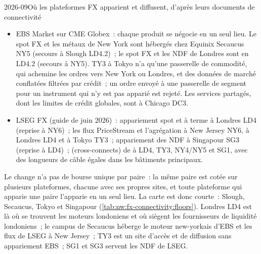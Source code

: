 \begin{dated}{2026-09}{Où les plateformes FX apparient et diffusent, d'après leurs documents de connectivité}\label{dat:nw:fx-connectivity:sites}
\begin{itemize}
\item EBS Market sur CME Globex~: chaque produit se négocie en un seul lieu. Le spot FX et les métaux de New York sont hébergés chez Equinix Secaucus NY5
  (secours à Slough LD4.2)~; le spot FX et les NDF de Londres sont en LD4.2 (secours à NY5). TY3 à Tokyo n'a qu'une passerelle de commodité, qui achemine les ordres
  vers New York ou Londres, et des données de marché conflatées filtrées par crédit~; un ordre envoyé à une passerelle de segment pour un instrument
  qui n'y est pas apparié est rejeté. Les services partagés, dont les limites de crédit globales, sont à Chicago DC3.
\item LSEG FX (guide de juin 2026)~: appariement spot et à terme à Londres LD4 (reprise à NY6)~; les flux PriceStream et
  l'agrégation à New Jersey NY6, à Londres LD4 et à Tokyo TY3~; appariement des NDF à Singapour SG3 (reprise à LD4)~; 
   (cross-connects) de  à LD4, TY3, NY4/NY5 et SG1, avec des longueurs de câble égales dans les bâtiments principaux.
\end{itemize}
\end{dated}

Le change n'a pas de bourse unique par paire~: la même paire est cotée sur plusieurs plateformes, chacune avec ses propres sites, et toute
plateforme qui apparie une paire l'apparie en un seul lieu. La carte est donc courte~: Slough, Secaucus, Tokyo et Singapour
(\cref{tab:nw:fx-connectivity:floors}). Londres LD4 est là où se trouvent les moteurs londoniens et où siègent les fournisseurs
de liquidité londoniens~; le campus de Secaucus héberge le moteur new-yorkais d'EBS et les flux de LSEG à New Jersey~; TY3 est un site d'accès et de diffusion sans
appariement EBS~; SG1 et SG3 servent les NDF de LSEG.

